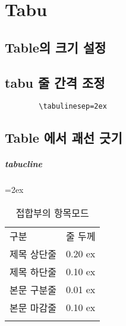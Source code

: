 \documentclass[12pt,a4paper]{report}
\begin{document}
	\newpage
	\chapter{Tabu}




%
%
%	
	\clearpage
	\section{Table의 크기 설정}



%
%
%	
	\clearpage
	\section{tabu 줄 간격 조정}

		\begin{verbatim}
		\tabulinesep=2ex
		\end{verbatim}




%
%
%	
	\clearpage
	\section{Table 에서 괘선 긋기}


	\paragraph{tabucline}

		\begin{table}[h]
		\caption{접합부의 항목모드}
		\tabulinesep=2ex
		\begin{tabu} to 1.0\textwidth { X[r,m, 1.0] X[c,m, 1.0] }
		\tabucline[0.2ex]{-}		
		구분			&줄 두께\\
		\tabucline[0.1ex]{-}		
		제목 상단줄 	&0.20 ex \\
		\tabucline[0.01ex]{-}		
		제목 하단줄 	&0.10 ex \\
		\tabucline[0.01ex]{-}		
		본문 구분줄 	&0.01 ex \\
		\tabucline[0.01ex]{-}		
		본문 마감줄 	&0.10 ex \\
		\tabucline[0.1ex]{-}		
		\end{tabu}
		\end{table}
\end{document}

